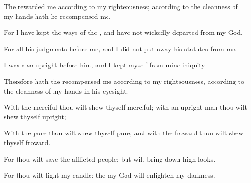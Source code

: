 {\Q {}The
{}
rewarded me according to my
righteousness; according to the
cleanness of my
hands hath he
recompensed me.


\par }{\Q {}For I have
kept the
ways of the
{}, and have not wickedly
departed from my
God.


\par }{\Q {}For all his
judgments
{} before me, and I did not put
away his
statutes from me.


\par }{\Q {}I was also
upright before him, and I
kept myself from mine
iniquity.


\par }{\Q {}Therefore hath the
{}
recompensed me according to my
righteousness, according to the
cleanness of my
hands in his
eyesight.


\par }{\Q {}With the
merciful thou wilt shew thyself
merciful; with an
upright
man thou wilt shew thyself
upright;


\par }{\Q {}With the
pure thou wilt shew thyself
pure; and with the
froward thou wilt shew thyself
froward.


\par }{\Q {}For thou wilt
save the
afflicted
people; but wilt bring
down
high
looks.


\par }{\Q {}For thou wilt
light my
candle: the
{} my
God will
enlighten my
darkness.


\par }{\BB \par }
